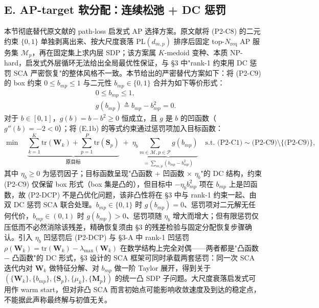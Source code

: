 \documentclass[12pt,a4paper]{article}
\newcommand{\mat}[1]{\mathbf{#1}}
\newcommand{\tr}{\text{tr}}
\begin{document}
\subsection*{E. AP-target 软分配：连续松弛 + DC 惩罚}

本节彻底替代原文献的 path-loss 启发式 AP 选择方案。原文献将 (P2-C8) 的二元约束 $\{0,1\}$ 单独剥离出来、按大尺度衰落 $\text{PL}(d_{m,p})$ 排序后固定 top-$N_{\text{req}}$ AP 服务集 $\mathcal{M}_p$，再在固定集上求内层 SDP；该方案属 $K$-medoid 变种、本质 NP-hard，启发式外层循环无法给出全局最优性保证，与 §3 中"rank-1 约束用 DC 惩罚 SCA 严密恢复"的整体风格不一致。本节给出的严密替代方案如下：将 (P2-C9) 的 box 约束 $0 \leq b_{mp} \leq 1$ 与二元性 $b_{mp} \in \{0,1\}$ 合并为如下等价形式：
\begin{subequations}\label{eq:b-rewrite}
\begin{align}
& 0 \leq b_{mp} \leq 1, \tag{E.1a} \\
& g(b_{mp}) \triangleq b_{mp} - b_{mp}^2 = 0. \tag{E.1b}
\end{align}
\end{subequations}
对于 $b \in [0,1]$，$g(b) = b - b^2 \geq 0$ 恒成立，且 $g$ 是 $b$ 的凹函数（$g''(b) = -2 < 0$）；将 (E.1b) 的等式约束通过惩罚项加入目标函数：
\begin{equation}
\min \quad \underbrace{\sum_{k=1}^K \tr(\mat{W}_k) + \sum_{p=1}^P \tr(\mat{S}_p)}_{\text{原目标}} \; + \; \eta_b \underbrace{\sum_{m \in \mathcal{M}, p \in \mathcal{P}} g(b_{mp})}_{= \sum_{m,p} (b_{mp} - b_{mp}^2)} \quad \text{s.t. (P2-C1)} \sim \text{(P2-C9)} \setminus \{\text{(P2-C9)}\}, \tag{P2-DCP}
\end{equation}
其中 $\eta_b \geq 0$ 为惩罚因子；目标函数呈现"凸函数 $+$ 凹函数 × $\eta_b$"的 DC 结构，约束 (P2-C9) 仅保留 box 形式（box 集是凸的），但目标中 $-\eta_b b_{mp}^2$ 项在 $b_{mp}$ 上是凹函数，故 (P2-DCP) 不是凸优化问题，该非凸性将在 \S3 中与 rank-1 约束一起、由双 DC 惩罚 SCA 联合处理。$b_{mp} \in \{0,1\}$ 时 $g(b_{mp}) = 0$、惩罚项对二元解无任何代价，$b_{mp} \in (0,1)$ 时 $g(b_{mp}) > 0$、惩罚项随 $\eta_b$ 增大而增大；但有限惩罚仅压低而不必然消除该残差，精确恢复须由 \S3 的残差检验与固定分配恢复步骤确认。引入 $\eta_b$ 凹惩罚后 (P2-DCP) 与 \S3-A 中 rank-1 凹惩罚 $\rho(\mat{W}_k) = \tr(\mat{W}_k) - \lambda_{\max}(\mat{W}_k)$ 在数学结构上完全对偶——两者都是"凸函数 $-$ 凸函数"的 DC 形式，\S3 设计的 SCA 框架可同时承载两套惩罚：同一次 SCA 迭代内对 $\mat{W}_k$ 做特征分解、对 $b_{mp}$ 做一阶 Taylor 展开，得到关于 $(\{\mat{W}_k\}, \{b_{mp}\}, \{\mat{S}_p\}, \{\mu_k\}, \{\mat{M}_p\})$ 的统一凸 SDP 子问题。大尺度衰落启发式可用作 warm start，但对非凸 SCA 而言初始点可能影响收敛速度及到达的稳定点，不能据此声称最终解与初值无关。
\end{document}
